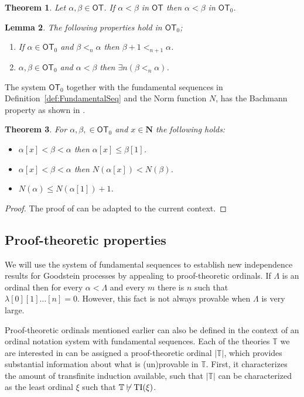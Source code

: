 \documentclass{amsart}
\theoremstyle{plain}
\theoremstyle{plain}
\newtheorem{theorem}{Theorem}
\newtheorem{lemma}[theorem]{Lemma}
\newcommand\OT{\mathsf{OT}}
\newcommand{\al}{{\alpha}}
\newcommand{\be}{{\beta}}
\newcommand{\la}{\lambda}
\begin{document}
\begin{theorem} %
Let $\al,\be \in \OT$. If  $\al<\be$ in $\OT$ then  $\al<\be$ in $\OT_0$.
\end{theorem}


\begin{lemma}The following properties hold in $\OT_0$;
\begin{enumerate}
    \item If $\al\in \OT_0$ and $\be <_n \al$ then $\be+1 <_{n+1}\al$.
    \item $\al,\be \in \OT_0$ and $\al<\be$ then $\exists n (\be<_n\al)$.
\end{enumerate}
\end{lemma}


The system $\OT_0$ together with the fundamental sequences in Definition~\ref{def:FundamentalSeq} and the Norm function $N$, has the Bachmann property as shown in \cite{Weiermann95}.
\begin{theorem}\label{thm:bachmannProp} For $\al,\be ,\in \OT_0$ and $x\in \mathbf{N}$ the following holds: 
\begin{itemize}
    \item $\al[x] < \be <\al$ then $\al[x] \leq \be[1]$.
    \item $\al[x] < \be <\al$ then $N(\al[x])<N(\be)$.
    \item $N(\al)\leq N(\al[1]) +1$.
\end{itemize}
\end{theorem}
\begin{proof}
The proof of \cite{Weiermann95} can be adapted to the current context.
\end{proof}


\subsection{Proof-theoretic properties}\label{subsec:ProofTheo}

We will use the system of fundamental sequences to establish new independence results for Goodstein processes by appealing to proof-theoretic ordinals. If $\Lambda$ is an ordinal then for every $\alpha<\Lambda $ and every $m$ there is $n$ such that $ \la [0][1] \ldots [n] = 0$. However, this fact is not always provable when $\Lambda$ is very large.


Proof-theoretic ordinals mentioned earlier can also be defined in the context of an ordinal notation system with fundamental sequences. 
Each of the theories $\mathbb{T}$ we are interested in can be assigned a proof-theoretic ordinal $|\mathbb{T}|$, which provides substantial information about what is (un)provable in $\mathbb{T}$.
First, it characterizes the amount of transfinite induction available, such that $|\mathbb{T}|$ can be characterized as the least ordinal $\xi$ such that $\mathbb{T}\not\vdash {\rm TI}(\xi)$.
\end{document}
